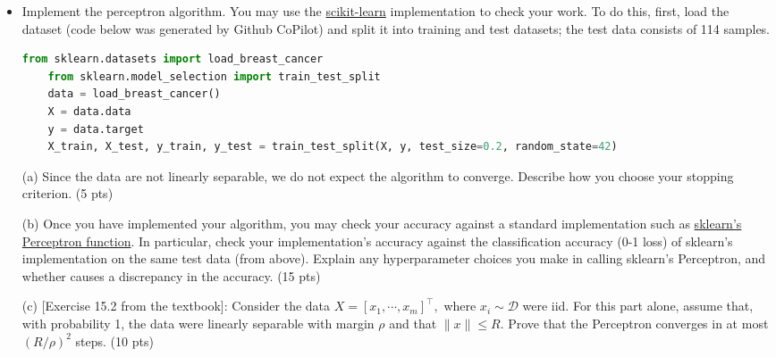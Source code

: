 \documentclass[12pt]{article}
\begin{document}
\begin{itemize}
	\item Implement the perceptron algorithm. You may use the \href{https://scikit-learn.org/stable/modules/generated/sklearn.linear_model.Perceptron.html}{scikit-learn} implementation to check your work. To do this, first, load the dataset (code below was generated by Github CoPilot) and split it into training and test datasets; the test data consists of 114 samples.
	\begin{lstlisting}[language=Python]
	from sklearn.datasets import load_breast_cancer
	from sklearn.model_selection import train_test_split
	data = load_breast_cancer()
	X = data.data
	y = data.target
	X_train, X_test, y_train, y_test = train_test_split(X, y, test_size=0.2, random_state=42)
	\end{lstlisting}
	\item[(a)] Since the data are not linearly separable, we do not expect the algorithm to converge. Describe how you choose your stopping criterion. (5 pts)
	\item[(b)] Once you have implemented your algorithm, you may check your accuracy against a standard implementation such as \href{https://scikit-learn.org/stable/modules/generated/sklearn.linear_model.Perceptron.html}{sklearn's Perceptron function}. In particular, check your implementation's accuracy against the classification accuracy (0-1 loss) of sklearn's implementation on the same test data (from above). Explain any hyperparameter choices you make in calling sklearn's Perceptron, and whether causes a discrepancy in the accuracy. (15 pts)
	\item[(c)] [Exercise 15.2 from the textbook]: 
		Consider the data $X = [x_1,\cdots, x_m]^\top,$ where $x_i \sim \mathcal{D}$ were iid. For this part alone, assume that, with probability 1, the data were linearly separable with margin $\rho$ and that $\|x\|\leq R$. Prove that the Perceptron converges in at most $(R/\rho)^2$ steps. (10 pts)
	

\end{itemize}
\end{document}
